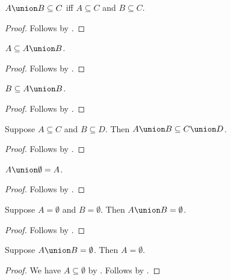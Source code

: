 \begin{proposition}\label{subseteq_union_iff}
    $A\union B\subseteq C$ iff $A\subseteq C$ and $B\subseteq C$.
\end{proposition}
\begin{proof}
    Follows by .
\end{proof}

\begin{proposition}\label{union_upper_left}
    $A\subseteq A\union B$.
\end{proposition}
\begin{proof}
    Follows by .
\end{proof}

\begin{proposition}\label{union_upper_right}
    $B\subseteq A\union B$.
\end{proposition}
\begin{proof}
    Follows by .
\end{proof}

\begin{proposition}\label{union_subseteq_union}
    Suppose $A\subseteq C$ and $B\subseteq D$.
    Then $A\union B\subseteq C\union D$.
\end{proposition}
\begin{proof}
    Follows by .
\end{proof}

\begin{proposition}%
\label{union_emptyset}
    $A\union\emptyset = A$.
\end{proposition}
\begin{proof}
    Follows by .
\end{proof}


\begin{proposition}%
\label{union_emptyset_intro}
    Suppose $A = \emptyset$ and $B = \emptyset$. Then $A\union B = \emptyset$.
\end{proposition}
\begin{proof}
    Follows by .
\end{proof}

\begin{proposition}%
\label{union_emptyset_elim_left}
    Suppose $A\union B = \emptyset$. Then $A = \emptyset$.
\end{proposition}
\begin{proof}
    We have $A\subseteq\emptyset$ by .
    Follows by .
\end{proof}


